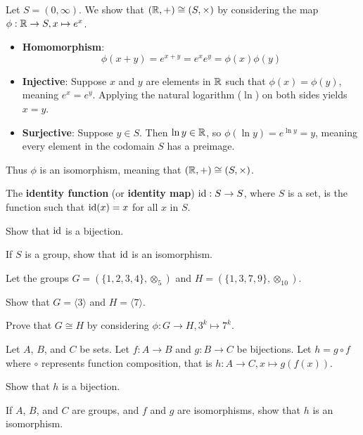 \begin{example}
    Let $S = (0,\infty)$. We show that $(\mathbb{R}, +) \cong (S, \times)$ by considering the map $\phi: \mathbb{R} \to S, x \mapsto e^x$.
    \begin{itemize}
        \item \textbf{Homomorphism}:
        \[
            \phi(x+y) = e^{x+y} = e^xe^y = \phi(x)\phi(y)
        \]

        \item \textbf{Injective}: Suppose $x$ and $y$ are elements in $\mathbb{R}$ such that $\phi(x) = \phi(y)$, meaning $e^x = e^y$. Applying the natural logarithm ($\ln$) on both sides yields $x = y$.

        \item \textbf{Surjective}: Suppose $y \in S$. Then $\ln y \in \mathbb{R}$, so $\phi(\ln y) = e^{\ln y} = y$, meaning every element in the codomain $S$ has a preimage.
    \end{itemize}

    Thus $\phi$ is an isomorphism, meaning that $(\mathbb{R}, +) \cong (S, \times)$.
\end{example}

\begin{exercise}\label{exercise-identity-map-is-isomorphism}
    The \textbf{identity function} (or \textbf{identity map}) $\mathrm{id}: S \to S$, where $S$ is a set, is the function such that $\mathrm{id}(x) = x$ for all $x$ in $S$.
    \begin{partquestions}{\roman*}
        \item Show that $\mathrm{id}$ is a bijection.
        \item If $S$ is a group, show that $\mathrm{id}$ is an isomorphism.
    \end{partquestions}
\end{exercise}
\begin{exercise}
    Let the groups $G = (\{1, 2, 3, 4\}, \otimes_5)$ and $H = (\{1, 3, 7, 9\}, \otimes_{10})$.
    \begin{partquestions}{\roman*}
        \item Show that $G = \langle 3 \rangle$ and $H = \langle 7 \rangle$.
        \item Prove that $G \cong H$ by considering $\phi: G \to H, 3^k \mapsto 7^k$.
    \end{partquestions}
\end{exercise}
\begin{exercise}\label{exercise-composition-of-isomorphisms-is-isomorphisms}
    Let $A$, $B$, and $C$ be sets. Let $f: A \to B$ and $g: B \to C$ be bijections. Let $h = g\circ f$ where $\circ$ represents function composition, that is $h: A \to C, x \mapsto g(f(x))$.
    \begin{partquestions}{\roman*}
        \item Show that $h$ is a bijection.
        \item If $A$, $B$, and $C$ are groups, and $f$ and $g$ are isomorphisms, show that $h$ is an isomorphism.
    \end{partquestions}
\end{exercise}


